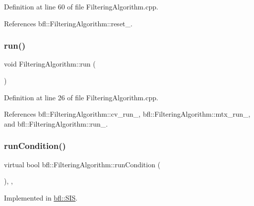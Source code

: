 Definition at line 60 of file Filtering\+Algorithm.\+cpp.



References bfl\+::\+Filtering\+Algorithm\+::reset\+\_\+.

\mbox{\label{classbfl_1_1FilteringAlgorithm_a009cbe5f4bbb16967f6c6ddcaed8fbb1}} 
\subsubsection{\texorpdfstring{run()}{run()}}
{\footnotesize\ttfamily void Filtering\+Algorithm\+::run (\begin{DoxyParamCaption}{ }\end{DoxyParamCaption})\hspace{0.3cm}{\ttfamily [inherited]}}



Definition at line 26 of file Filtering\+Algorithm.\+cpp.



References bfl\+::\+Filtering\+Algorithm\+::cv\+\_\+run\+\_\+, bfl\+::\+Filtering\+Algorithm\+::mtx\+\_\+run\+\_\+, and bfl\+::\+Filtering\+Algorithm\+::run\+\_\+.

\mbox{\label{classbfl_1_1FilteringAlgorithm_a5fc12882356f6906b102fbfff2bc4b7c}} 
\subsubsection{\texorpdfstring{run\+Condition()}{runCondition()}}
{\footnotesize\ttfamily virtual bool bfl\+::\+Filtering\+Algorithm\+::run\+Condition (\begin{DoxyParamCaption}{ }\end{DoxyParamCaption})\hspace{0.3cm}{\ttfamily [protected]}, {}, {\ttfamily [inherited]}}



Implemented in \mbox{\hyperlink{classbfl_1_1SIS_afb7cff1f7dae80e0e4ca84c925ca3ac3}{bfl\+::\+S\+IS}}.



